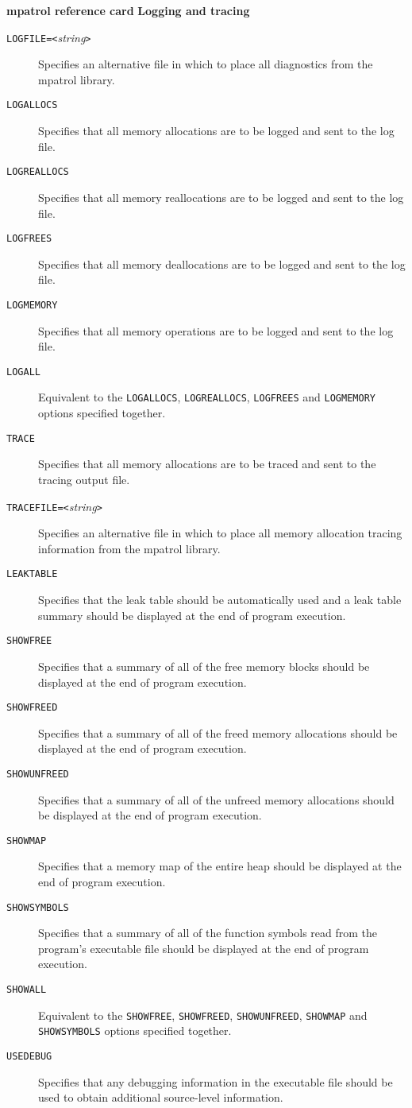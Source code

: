 \documentclass[a4paper,landscape,final]{article}
\newcommand{\heading}[1]{\textbf{\normalsize #1}}
\newcommand{\option}[1]{\texttt{#1}}
\newcommand{\optionpar}[2]{\option{#1}\texttt{=<}\textit{#2}\texttt{>}}
\begin{document}
\begin{multicols}{3}{\textbf{\Large mpatrol reference card}}
\vskip 12pt
\heading{Logging and tracing}
\vskip 6pt

\begin{description}
\item[\optionpar{LOGFILE}{string}]
Specifies an alternative file in which to place all diagnostics from the mpatrol
library.
\item[\option{LOGALLOCS}]
Specifies that all memory allocations are to be logged and sent to the log file.
\item[\option{LOGREALLOCS}]
Specifies that all memory reallocations are to be logged and sent to the log
file.
\item[\option{LOGFREES}]
Specifies that all memory deallocations are to be logged and sent to the log
file.
\item[\option{LOGMEMORY}]
Specifies that all memory operations are to be logged and sent to the log file.
\item[\option{LOGALL}]
Equivalent to the \option{LOGALLOCS}, \option{LOGREALLOCS}, \option{LOGFREES}
and \option{LOGMEMORY} options specified together.
\item[\option{TRACE}]
Specifies that all memory allocations are to be traced and sent to the tracing
output file.
\item[\optionpar{TRACEFILE}{string}]
Specifies an alternative file in which to place all memory allocation tracing
information from the mpatrol library.
\item[\option{LEAKTABLE}]
Specifies that the leak table should be automatically used and a leak table
summary should be displayed at the end of program execution.
\item[\option{SHOWFREE}]
Specifies that a summary of all of the free memory blocks should be displayed at
the end of program execution.
\item[\option{SHOWFREED}]
Specifies that a summary of all of the freed memory allocations should be
displayed at the end of program execution.
\item[\option{SHOWUNFREED}]
Specifies that a summary of all of the unfreed memory allocations should be
displayed at the end of program execution.
\item[\option{SHOWMAP}]
Specifies that a memory map of the entire heap should be displayed at the end of
program execution.
\item[\option{SHOWSYMBOLS}]
Specifies that a summary of all of the function symbols read from the program's
executable file should be displayed at the end of program execution.
\item[\option{SHOWALL}]
Equivalent to the \option{SHOWFREE}, \option{SHOWFREED}, \option{SHOWUNFREED},
\option{SHOWMAP} and \option{SHOWSYMBOLS} options specified together.
\item[\option{USEDEBUG}]
Specifies that any debugging information in the executable file should be used
to obtain additional source-level information.
\end{description}


\end{multicols}
\end{document}
